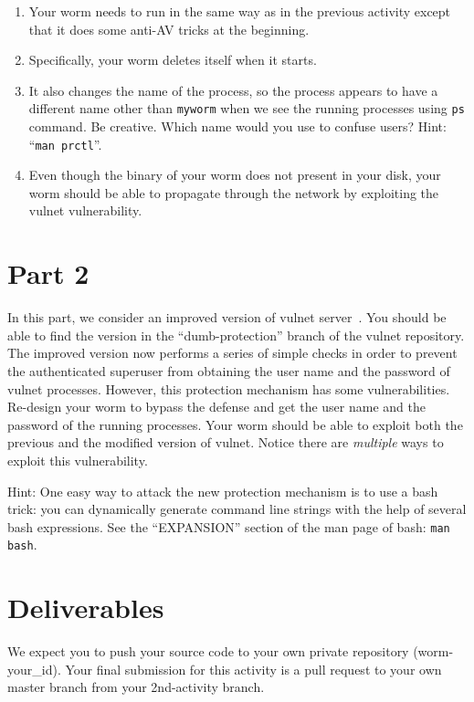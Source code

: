 \documentclass[a4paper, 11pt]{article}
\theoremstyle{definition}
\begin{document}
{\begin{enumerate}
  \item Your worm needs to run in the same way as in the previous
    activity except that it does some anti-AV tricks at the beginning.

  \item Specifically, your worm deletes itself when it starts.

  \item It also changes the name of the process, so the process
    appears to have a different name other than \texttt{myworm} when
    we see the running processes using \texttt{ps} command. Be
    creative. Which name would you use to confuse users? Hint:
    ``\texttt{man prctl}''.

  \item Even though the binary of your worm does not present in your
    disk, your worm should be able to propagate through the network by
    exploiting the vulnet vulnerability.

\end{enumerate}

\section{Part 2}

In this part, we consider an improved version of vulnet
server~\cite{vulnet}. You should be able to find the version in the
``dumb-protection'' branch of the vulnet repository. The improved
version now performs a series of simple checks in order to prevent the
authenticated superuser from obtaining the user name and the password
of vulnet processes. However, this protection mechanism has some
vulnerabilities. Re-design your worm to bypass the defense and get the
user name and the password of the running processes. Your worm should
be able to exploit both the previous and the modified version of
vulnet. Notice there are \emph{multiple} ways to exploit this
vulnerability.

Hint: One easy way to attack the new protection mechanism is to use a
bash trick: you can dynamically generate command line strings with the
help of several bash expressions. See the ``EXPANSION'' section of the
man page of bash: \texttt{man bash}.

\section{Deliverables}

We expect you to push your source code to your own private repository
(worm-your\_id). Your final submission for this activity is a pull
request to your own master branch from your 2nd-activity branch.

}
\end{document}
